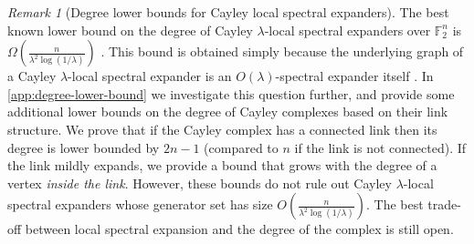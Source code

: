 \documentclass[10pt,a4paper]{article}
\newcommand{\prettyref}[1]{\cref{#1}}
\theoremstyle{definition}
\theoremstyle{remark}
\newtheorem{remark}[theorem]{Remark}
\newcommand{\Authornotecolored}[3]{{\sffamily\small\color{#1}{[#2: #3]}}}
\newcommand{\Authornotecolored}[3]{}
\newcommand{\Ynote}{\Authornotecolored{Purple}{Y}}
\newcommand{\F}{\mathbb{F}}
\numberwithin{equation}{section}
\let\pref=\prettyref
\begin{document}
\begin{remark}[Degree lower bounds for Cayley local spectral expanders]
The best known lower bound on the degree of Cayley $\lambda$-local spectral expanders over \(\F_2^n\) is $\Omega \left (\frac{n}{\lambda^2 \log (1/\lambda)} \right)$ \cite{alon1992simple}. This bound is obtained simply because the underlying graph of a Cayley \(\lambda\)-local spectral expander is an \(O(\lambda)\)-spectral expander itself \cite{oppenheim2018local}. In \pref{app:degree-lower-bound} we investigate this question further, and provide some additional lower bounds on the degree of Cayley complexes based on their link structure. We prove that if the Cayley complex has a connected link then its degree is lower bounded by \(2n-1\) (compared to \(n\) if the link is not connected). If the link mildly expands, we provide a bound that grows with the degree of a vertex \emph{inside the link}. However, these bounds do not rule out Cayley \(\lambda\)-local spectral expanders whose generator set has size $O \left (\frac{n}{\lambda^2 \log (1/\lambda)} \right)$. The best trade-off between local spectral expansion and the degree of the complex is still open.
\end{remark}
\end{document}
